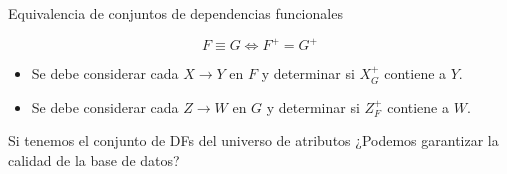 \begin{frame}{Equivalencia de conjuntos de dependencias funcionales}

    $$
        F \equiv G \Leftrightarrow F^+ = G^+
    $$

    \begin{itemize}
        \item Se debe considerar cada $X \to Y$ en $F$ y determinar si $X^+_G$ contiene
        a $Y$.
        \item Se debe considerar cada $Z \to W$ en $G$ y determinar si $Z^+_F$ contiene
        a $W$.
    \end{itemize}
\end{frame}


\begin{frame}{Si tenemos el conjunto de DFs del universo de atributos}
    \centering
    \LARGE ¿Podemos garantizar la calidad de la base de datos?
    
\end{frame}